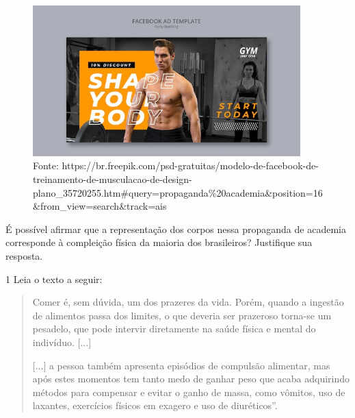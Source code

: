 \begin{figure}[htpb!]
\includegraphics[width=4.07407in,height=2.28999in]{./imgs/img4.jpg}
\caption{Fonte: https://br.freepik.com/psd-gratuitas/modelo-de-facebook-de-treinamento-de-musculacao-de-design-plano\_35720255.htm\#query=propaganda\%20academia\&position=16\&from\_view=search\&track=ais}
\end{figure}

É possível afirmar que a representação dos corpos nessa propaganda de 
academia corresponde à compleição física da maioria dos brasileiros?
Justifique sua resposta.





\num{1} Leia o texto a seguir:

\begin{quote}
Comer é, sem dúvida, um dos prazeres da vida. Porém, quando a ingestão
de alimentos passa dos limites, o que deveria ser prazeroso torna-se um
pesadelo, que pode intervir diretamente na saúde física e mental do
indivíduo. {[}...{]}

{[}...{]} a pessoa também apresenta episódios de compulsão alimentar,
mas após estes momentos tem tanto medo de ganhar peso que acaba
adquirindo métodos para compensar e evitar o ganho de massa, como
vômitos, uso de laxantes, exercícios físicos em exagero e uso de
diuréticos''.

\end{quote}

